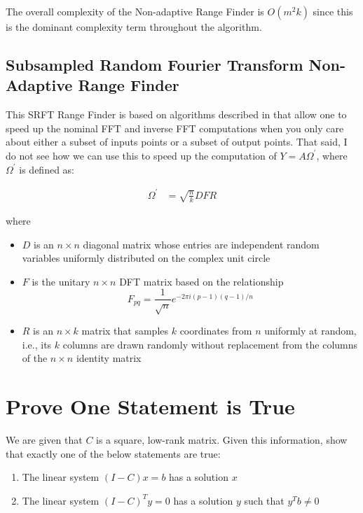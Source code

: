 \documentclass{article}[11pt]
\begin{document}
   The overall complexity of the Non-adaptive Range Finder is $O(m^2 k)$ since this is the dominant complexity term throughout the algorithm.
   
   \subsection{Subsampled Random Fourier Transform Non-Adaptive Range Finder}
   This SRFT Range Finder is based on algorithms described in \cite{fdft} that allow one to speed up the nominal FFT and inverse FFT computations when you only care about either a subset of inputs points or a subset of output points. That said, I do not see how we can use this to speed up the computation of $Y = A\Omega^{'}$, where $\Omega^{'}$ is defined as:
   
   \begin{align*}
   \Omega^{'} &= \sqrt{\frac{n}{k}} D F R
   \end{align*}
   
   where 
   
   \begin{itemize}
   \item $D$ is an $n \times n$ diagonal matrix whose entries are independent random variables uniformly distributed on the complex unit circle
   \item $F$ is the unitary $n \times n$ DFT matrix based on the relationship \\ $$F_{pq} = \frac{1}{\sqrt{n}} e^{-2\pi i (p-1) (q-1) / n}$$
   \item $R$ is an $n\times k$ matrix that samples $k$ coordinates from $n$ uniformly at random, i.e., its $k$ columns are drawn randomly without replacement from the columns of the $n\times n$ identity matrix
   \end{itemize}
   
   \newpage
   \section{Prove One Statement is True}
   We are given that $C$ is a square, low-rank matrix. Given this information, show that exactly one of the below statements are true:
   
   \begin{enumerate}[label=(\Alph*)]
   \item The linear system $(I-C)x = b$ has a solution $x$
   \item The linear system $(I-C)^Ty = 0$ has a solution $y$ such that $y^Tb \neq 0$
   \end{enumerate}
   
\end{document}
